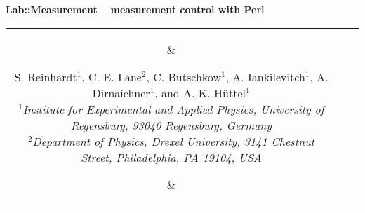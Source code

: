 \documentclass[portrait]{a0poster}
\begin{document}
\color{text}
\Large
%
\newlength{\seplength}
\newlength{\headerheight}
\newlength{\columnheight}
\newlength{\columnheighta}
\newlength{\columnheightb}
%
\setlength{\columnheight}{107cm}
\setlength{\columnheighta}{\columnheight-6cm}
\setlength{\columnheightb}{\columnheight+6.5cm}
\setlength{\columnwidth}{0.31\textwidth}
%
\setlength{\fboxsep}{10mm}
\setlength{\fboxrule}{0mm}
%
%
%
%
\hspace*{-1cm}\begin{minipage}[t][][t]{\textwidth-2\fboxsep-8\fboxrule}
\color{invheading}
\begin{center}
{
\VERYHuge \vspace*{-0.6cm}
\textsf{\textbf{
Lab::Measurement -- measurement control with Perl
}}
}
\\[\baselineskip]
\begin{tabular}{ccc}
\parbox{5cm}{\vspace*{-1cm}
\begin{center}
\end{center}
}
&
\parbox{70cm}{
\begin{center} 
{
\vspace*{-0.5cm}
\huge 
S. Reinhardt$^1$, C. E. Lane$^2$, C. Butschkow$^1$, A. Iankilevitch$^1$, A. 
Dirnaichner$^1$, 
and A. K. Hüttel$^1$
}
\\[\medskipamount]
{\it 
\Large
$^1$Institute for Experimental and Applied
Physics, University of Regensburg, 93040 Regensburg, Germany\\
$^2$Department of Physics, Drexel University, 3141 Chestnut Street, 
Philadelphia, PA 19104, USA\\
}
\end{center}
\vspace*{0.5cm}
}
&
\parbox{5cm}{\vspace*{-1cm}
\begin{center}
\end{center}
}
\end{tabular}
\end{center}
\end{minipage}
\vspace*{9mm}
\end{document}
